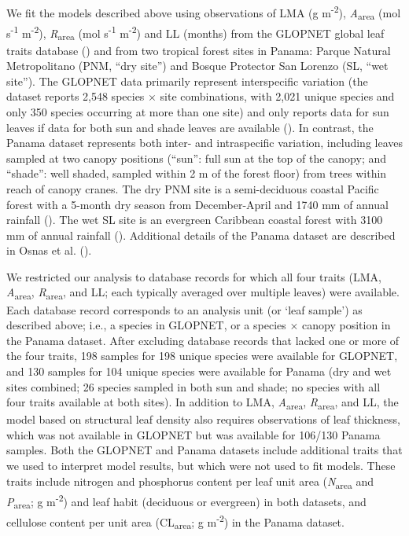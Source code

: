 \documentclass[
  12pt,
  letterpaper,
  DIV=11,
  numbers=noendperiod]{scrartcl}
\begin{document}
We fit the models described above using observations of LMA (g
m\textsuperscript{-2}), \emph{A}\textsubscript{area} (mol
s\textsuperscript{-1} m\textsuperscript{-2}),
\emph{R}\textsubscript{area} (mol s\textsuperscript{-1}
m\textsuperscript{-2}) and LL (months) from the GLOPNET global leaf
traits database () and
from two tropical forest sites in Panama: Parque Natural Metropolitano
(PNM, ``dry site'') and Bosque Protector San Lorenzo (SL, ``wet site'').
The GLOPNET data primarily represent interspecific variation (the
dataset reports 2,548 species \(\times\) site combinations, with 2,021
unique species and only 350 species occurring at more than one site) and
only reports data for sun leaves if data for both sun and shade leaves
are available (). In
contrast, the Panama dataset represents both inter- and intraspecific
variation, including leaves sampled at two canopy positions (``sun'':
full sun at the top of the canopy; and ``shade'': well shaded, sampled
within 2 m of the forest floor) from trees within reach of canopy
cranes. The dry PNM site is a semi-deciduous coastal Pacific forest with
a 5-month dry season from December-April and 1740 mm of annual rainfall
(). The wet SL site is an
evergreen Caribbean coastal forest with 3100 mm of annual rainfall
(). Additional details of
the Panama dataset are described in Osnas et al.
().

We restricted our analysis to database records for which all four traits
(LMA, \emph{A}\textsubscript{area}, \emph{R}\textsubscript{area}, and
LL; each typically averaged over multiple leaves) were available. Each
database record corresponds to an analysis unit (or `leaf sample') as
described above; i.e., a species in GLOPNET, or a species \(\times\)
canopy position in the Panama dataset. After excluding database records
that lacked one or more of the four traits, 198 samples for 198 unique
species were available for GLOPNET, and 130 samples for 104 unique
species were available for Panama (dry and wet sites combined; 26
species sampled in both sun and shade; no species with all four traits
available at both sites). In addition to LMA,
\emph{A}\textsubscript{area}, \emph{R}\textsubscript{area}, and LL, the
model based on structural leaf density also requires observations of
leaf thickness, which was not available in GLOPNET but was available for
106/130 Panama samples. Both the GLOPNET and Panama datasets include
additional traits that we used to interpret model results, but which
were not used to fit models. These traits include nitrogen and
phosphorus content per leaf unit area (\emph{N}\textsubscript{area} and
\emph{P}\textsubscript{area}; g m\textsuperscript{-2}) and leaf habit
(deciduous or evergreen) in both datasets, and cellulose content per
unit area (CL\textsubscript{area}; g m\textsuperscript{-2}) in the
Panama dataset.
\end{document}
